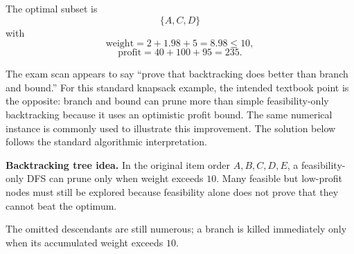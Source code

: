 \documentclass[10.5pt,a4paper]{article}
\begin{document}
\begin{answerbox}
The optimal subset is
\[
\boxed{\{A,C,D\}}
\]
with
\[
\text{weight}=2+1.98+5=8.98\le10,
\]
\[
\text{profit}=40+100+95=\boxed{235}.
\]

\begin{warningbox}
The exam scan appears to say ``prove that backtracking does better than branch and bound.'' For this standard knapsack example, the intended textbook point is the opposite: branch and bound can prune more than simple feasibility-only backtracking because it uses an optimistic profit bound. The same numerical instance is commonly used to illustrate this improvement. The solution below follows the standard algorithmic interpretation.
\end{warningbox}

\textbf{Backtracking tree idea.} In the original item order $A,B,C,D,E$, a feasibility-only DFS can prune only when weight exceeds $10$. Many feasible but low-profit nodes must still be explored because feasibility alone does not prove that they cannot beat the optimum.

\begin{center}
\end{center}
The omitted descendants are still numerous; a branch is killed immediately only when its accumulated weight exceeds $10$.


\end{answerbox}
\end{document}
